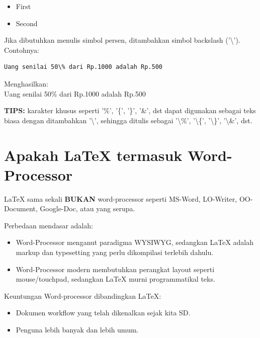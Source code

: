 \documentclass{book} %
\begin{document}
    \begin{itemize}
        \item First %
        \item Second %
    \end{itemize}

	\newpage
    Jika dibutuhkan menulis simbol persen, ditambahkan simbol backslash ('\textbackslash').
    Contohnya:

    \begin{verbatim}
Uang senilai 50\% dari Rp.1000 adalah Rp.500
    \end{verbatim}

    Menghasilkan: \\
    Uang senilai 50\% dari Rp.1000 adalah Rp.500
    
    \bigskip
    
    \textbf{TIPS:} karakter khusus seperti '\%', '\{', '\}', '\&', dst dapat digunakan sebagai teks biasa dengan ditambahkan
    '\textbackslash', sehingga ditulis sebagai '\textbackslash\%', '\textbackslash\{', '\textbackslash\}', '\textbackslash\&', dst. 

    \section{Apakah \LaTeX{} termasuk Word-Processor}

    \LaTeX{} sama sekali \textbf{BUKAN} word-processor seperti MS-Word, LO-Writer, OO-Document, Google-Doc, atau yang serupa.

    \bigskip

    Perbedaan mendasar adalah:
    \begin{itemize}
        \item Word-Processor menganut paradigma WYSIWYG,
        sedangkan \LaTeX{} adalah markup dan typesetting yang perlu dikompilasi terlebih dahulu.

        \item Word-Processor modern membutuhkan perangkat layout seperti mouse/touchpad,
        sedangkan \LaTeX{} murni programmatikal teks.
    \end{itemize}

    \bigskip

    Keuntungan Word-processor dibandingkan \LaTeX{}:
    \begin{itemize}
        \item Dokumen workflow yang telah dikenalkan sejak kita SD.
        \item Penguna lebih banyak dan lebih umum.
    \end{itemize}
\end{document}
